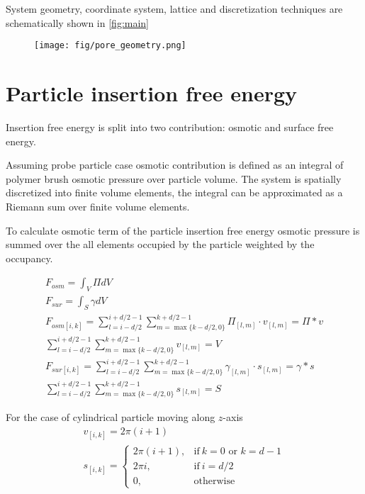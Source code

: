 \documentclass[12pt, a4paper]{article}
\begin{document}
System geometry, coordinate system, lattice and discretization techniques are schematically shown in \ref{fig:main} 
\begin{figure}
    \texttt{[image: fig/pore\_geometry.png]}

    \label{fig:size}
\end{figure}

\section{Particle insertion free energy}

Insertion free energy is split into two contribution: osmotic and surface free energy.

Assuming probe particle case osmotic contribution is defined as an integral of polymer brush osmotic pressure over particle volume. The system is spatially discretized into finite volume elements, the integral can be approximated as a Riemann sum over finite volume elements. 

To calculate osmotic term of the particle insertion free energy osmotic pressure is summed over the all elements occupied by the particle weighted by the occupancy. 

\begin{eqnarray}
    F_{osm} = \int_V \Pi dV
    \\
    F_{sur} = \int_S \gamma dV
    \\
    F_{osm [i, k]} = \sum_{l=i-d/2}^{i+d/2-1} \sum_{m=\max\{k-d/2, 0\}}^{k+d/2-1} \Pi_{[l,m]} \cdot v_{[l, m]} = \Pi \ast v
    \\
    \sum_{l=i-d/2}^{i+d/2-1} \sum_{m=\max\{k-d/2, 0\}}^{k+d/2-1} v_{[l, m]} = V
    \\
    F_{sur [i, k]} = \sum_{l=i-d/2}^{i+d/2-1} \sum_{m=\max\{k-d/2, 0\}}^{k+d/2-1} \gamma_{[l,m]} \cdot s_{[l, m]} = \gamma \ast s
    \\
    \sum_{l=i-d/2}^{i+d/2-1} \sum_{m=\max\{k-d/2, 0\}}^{k+d/2-1} s_{[l, m]} = S
\end{eqnarray}

For the case of cylindrical particle moving along $z$-axis
\begin{eqnarray}
    v_{[i,k]}=2\pi(i+1)
    \\
    s_{[i,k]} = 
    \begin{cases}
        2\pi(i+1), & \text{if}\ k=0 \text{ or } k=d-1 \\
        2 \pi i,   & \text{if}\ i=d/2 \\
        0,         & \text{otherwise}
    \end{cases}
\end{eqnarray}
\end{document}
